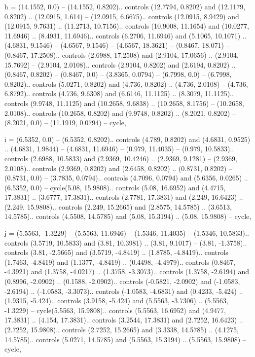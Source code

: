 h = {(14.1552, 0.0) -- (14.1552, 0.8202).. controls (12.7794, 0.8202) and (12.1179, 0.8202) .. (12.0915, 1.614) -- (12.0915, 6.6675).. controls (12.0915, 8.9429) and (12.0915, 9.7631) .. (11.2713, 10.7156).. controls (10.9008, 11.1654) and (10.0277, 11.6946) .. (8.4931, 11.6946).. controls (6.2706, 11.6946) and (5.1065, 10.1071) .. (4.6831, 9.1546) -- (4.6567, 9.1546) -- (4.6567, 18.3621) -- (0.8467, 18.071) -- (0.8467, 17.2508).. controls (2.6988, 17.2508) and (2.9104, 17.0656) .. (2.9104, 15.7692) -- (2.9104, 2.0108).. controls (2.9104, 0.8202) and (2.6194, 0.8202) .. (0.8467, 0.8202) -- (0.8467, 0.0) -- (3.8365, 0.0794) -- (6.7998, 0.0) -- (6.7998, 0.8202).. controls (5.0271, 0.8202) and (4.736, 0.8202) .. (4.736, 2.0108) -- (4.736, 6.8792).. controls (4.736, 9.6308) and (6.6146, 11.1125) .. (8.3079, 11.1125).. controls (9.9748, 11.1125) and (10.2658, 9.6838) .. (10.2658, 8.1756) -- (10.2658, 2.0108).. controls (10.2658, 0.8202) and (9.9748, 0.8202) .. (8.2021, 0.8202) -- (8.2021, 0.0) -- (11.1919, 0.0794) -- cycle},

i = {(6.5352, 0.0) -- (6.5352, 0.8202).. controls (4.789, 0.8202) and (4.6831, 0.9525) .. (4.6831, 1.9844) -- (4.6831, 11.6946) -- (0.979, 11.4035) -- (0.979, 10.5833).. controls (2.6988, 10.5833) and (2.9369, 10.4246) .. (2.9369, 9.1281) -- (2.9369, 2.0108).. controls (2.9369, 0.8202) and (2.6458, 0.8202) .. (0.8731, 0.8202) -- (0.8731, 0.0) -- (3.7835, 0.0794).. controls (4.7096, 0.0794) and (5.6356, 0.0265) .. (6.5352, 0.0) -- cycle(5.08, 15.9808).. controls (5.08, 16.6952) and (4.4715, 17.3831) .. (3.6777, 17.3831).. controls (2.7781, 17.3831) and (2.249, 16.6423) .. (2.249, 15.9808).. controls (2.249, 15.2665) and (2.8575, 14.5785) .. (3.6513, 14.5785).. controls (4.5508, 14.5785) and (5.08, 15.3194) .. (5.08, 15.9808) -- cycle},

j = {(5.5563, -1.3229) -- (5.5563, 11.6946) -- (1.5346, 11.4035) -- (1.5346, 10.5833).. controls (3.5719, 10.5833) and (3.81, 10.3981) .. (3.81, 9.1017) -- (3.81, -1.3758).. controls (3.81, -2.5665) and (3.5719, -4.8419) .. (1.8785, -4.8419).. controls (1.7463, -4.8419) and (1.1377, -4.8419) .. (0.4498, -4.4979).. controls (0.8467, -4.3921) and (1.3758, -4.0217) .. (1.3758, -3.3073).. controls (1.3758, -2.6194) and (0.8996, -2.0902) .. (0.1588, -2.0902).. controls (-0.5821, -2.0902) and (-1.0583, -2.6194) .. (-1.0583, -3.3073).. controls (-1.0583, -4.6831) and (0.4233, -5.424) .. (1.9315, -5.424).. controls (3.9158, -5.424) and (5.5563, -3.7306) .. (5.5563, -1.3229) -- cycle(5.5563, 15.9808).. controls (5.5563, 16.6952) and (4.9477, 17.3831) .. (4.154, 17.3831).. controls (3.2544, 17.3831) and (2.7252, 16.6423) .. (2.7252, 15.9808).. controls (2.7252, 15.2665) and (3.3338, 14.5785) .. (4.1275, 14.5785).. controls (5.0271, 14.5785) and (5.5563, 15.3194) .. (5.5563, 15.9808) -- cycle},

